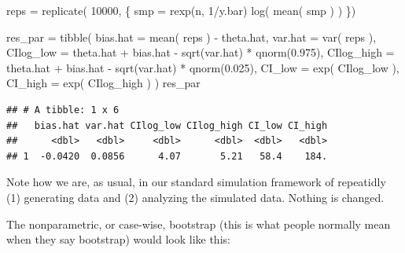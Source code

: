 \documentclass[
]{book}
\newenvironment{Shaded}{\begin{snugshade}}{\end{snugshade}}
\newcommand{\AttributeTok}[1]{\textcolor[rgb]{0.77,0.63,0.00}{#1}}
\newcommand{\DecValTok}[1]{\textcolor[rgb]{0.00,0.00,0.81}{#1}}
\newcommand{\FloatTok}[1]{\textcolor[rgb]{0.00,0.00,0.81}{#1}}
\newcommand{\FunctionTok}[1]{\textcolor[rgb]{0.00,0.00,0.00}{#1}}
\newcommand{\NormalTok}[1]{#1}
\newcommand{\OtherTok}[1]{\textcolor[rgb]{0.56,0.35,0.01}{#1}}
\newcommand{\SpecialCharTok}[1]{\textcolor[rgb]{0.00,0.00,0.00}{#1}}
\begin{document}
\begin{Shaded}
\begin{Highlighting}[]
\NormalTok{reps }\OtherTok{=} \FunctionTok{replicate}\NormalTok{( }\DecValTok{10000}\NormalTok{, \{}
\NormalTok{    smp }\OtherTok{=} \FunctionTok{rexp}\NormalTok{(n, }\DecValTok{1}\SpecialCharTok{/}\NormalTok{y.bar)}
    \FunctionTok{log}\NormalTok{( }\FunctionTok{mean}\NormalTok{( smp ) )}
\NormalTok{\})}

\NormalTok{res\_par }\OtherTok{=} \FunctionTok{tibble}\NormalTok{( }
  \AttributeTok{bias.hat =} \FunctionTok{mean}\NormalTok{( reps ) }\SpecialCharTok{{-}}\NormalTok{ theta.hat,}
  \AttributeTok{var.hat =} \FunctionTok{var}\NormalTok{( reps ),}
  \AttributeTok{CIlog\_low =}\NormalTok{ theta.hat }\SpecialCharTok{+}\NormalTok{ bias.hat }\SpecialCharTok{{-}} \FunctionTok{sqrt}\NormalTok{(var.hat) }\SpecialCharTok{*} \FunctionTok{qnorm}\NormalTok{(}\FloatTok{0.975}\NormalTok{),}
  \AttributeTok{CIlog\_high =}\NormalTok{ theta.hat }\SpecialCharTok{+}\NormalTok{ bias.hat }\SpecialCharTok{{-}} \FunctionTok{sqrt}\NormalTok{(var.hat) }\SpecialCharTok{*} \FunctionTok{qnorm}\NormalTok{(}\FloatTok{0.025}\NormalTok{),}
  \AttributeTok{CI\_low =} \FunctionTok{exp}\NormalTok{( CIlog\_low ),}
  \AttributeTok{CI\_high =} \FunctionTok{exp}\NormalTok{( CIlog\_high ) )}
\NormalTok{res\_par}
\end{Highlighting}
\end{Shaded}

\begin{verbatim}
## # A tibble: 1 x 6
##   bias.hat var.hat CIlog_low CIlog_high CI_low CI_high
##      <dbl>   <dbl>     <dbl>      <dbl>  <dbl>   <dbl>
## 1  -0.0420  0.0856      4.07       5.21   58.4    184.
\end{verbatim}

Note how we are, as usual, in our standard simulation framework of repeatidly (1) generating data and (2) analyzing the simulated data.
Nothing is changed.

The nonparametric, or case-wise, bootstrap (this is what people normally mean when they say bootstrap) would look like this:
\end{document}

